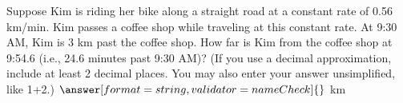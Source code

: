 \documentclass[handout]{ximera}
\begin{document}
\begin{problem}
Suppose Kim is riding her bike along a straight road at a constant rate of 0.56 km/min. Kim passes a coffee shop while traveling at this constant rate. At 9:30 AM, Kim is 3 km past the coffee shop. How far is Kim from the coffee shop at 9:54.6 (i.e., 24.6 minutes past 9:30 AM)? (If you use a decimal approximation, include at least 2 decimal places. You may also enter your answer unsimplified, like 1+2.)
$\answer[format=string,validator=nameCheck]{}$ km
\end{problem}
\end{document}
